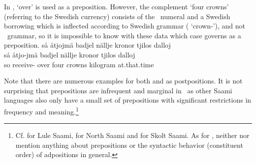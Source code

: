 In ,  ‘over’ is used as a preposition. %
However, the complement  ‘four crowns’ (referring to the Swedish currency) consists of the \PS\ numeral  and a Swedish borrowing  which is inflected according to Swedish grammar ( ‘crown-\PLs’), and not \PS\ grammar, so it is impossible to know with these data which case  governs as a preposition. 
\ea\label{prepositionEx2}%
\glll	så åtjojmä badjel nällje kronor tjilos dalloj\\
	så åtjo-jmä badjel nällje kronor tjilos dalloj\\
	so receive- over four crowns kilogram at.that.time\\\nopagebreak
{}	
\z

Note that there are numerous examples for both  and  as postpositions. 
It is not surprising that prepositions are infrequent and marginal in \PS\ as other Saami languages also only have a small set of prepositions with significant restrictions in frequency and meaning.\footnote{Cf. \citet[91-92]{Spiik1989} for Lule Saami, \citet[84-85]{Svonni2009} for North Saami and \citet[314-317]{Feist2010} for Skolt Saami. As for \PS, neither \citet{Lagercrantz1926} nor \citet{Lehtiranta1992} mention anything about prepositions or the syntactic behavior (constituent order) of adpositions in general.} %



